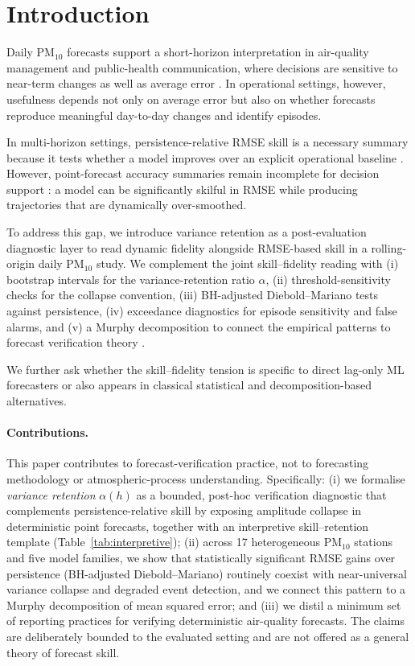 \documentclass[3p,times,single-column]{elsarticle}
\begin{document}
\section{Introduction}

Daily PM$_{10}$ forecasts support a short-horizon interpretation in air-quality management and public-health communication, where decisions are sensitive to near-term changes as well as average error \cite{who2021,wilks2011}. In operational settings, however, usefulness depends not only on average error but also on whether forecasts reproduce meaningful day-to-day changes and identify episodes.

In multi-horizon settings, persistence-relative RMSE skill is a necessary summary because it tests whether a model improves over an explicit operational baseline \cite{hyndman2006}. However, point-forecast accuracy summaries remain incomplete for decision support \cite{gneiting2011}: a model can be significantly skilful in RMSE while producing trajectories that are dynamically over-smoothed.

To address this gap, we introduce variance retention as a post-evaluation diagnostic layer to read dynamic fidelity alongside RMSE-based skill in a rolling-origin daily PM$_{10}$ study. We complement the joint skill–fidelity reading with (i) bootstrap intervals for the variance-retention ratio $\alpha$, (ii) threshold-sensitivity checks for the collapse convention, (iii) BH-adjusted Diebold–Mariano tests against persistence, (iv) exceedance diagnostics for episode sensitivity and false alarms, and (v) a Murphy decomposition to connect the empirical patterns to forecast verification theory \cite{murphy1988}.

We further ask whether the skill–fidelity tension is specific to direct lag-only ML forecasters or also appears in classical statistical and decomposition-based alternatives.

\paragraph{Contributions.} This paper contributes to forecast-verification
practice, not to forecasting methodology or atmospheric-process understanding.
Specifically: (i) we formalise \emph{variance retention} $\alpha(h)$ as a
bounded, post-hoc verification diagnostic that complements persistence-relative
skill by exposing amplitude collapse in deterministic point forecasts, together
with an interpretive skill--retention template (Table~\ref{tab:interpretive});
(ii) across 17 heterogeneous PM$_{10}$ stations and five model families, we show
that statistically significant RMSE gains over persistence (BH-adjusted
Diebold--Mariano) routinely coexist with near-universal variance collapse and
degraded event detection, and we connect this pattern to a Murphy decomposition
of mean squared error; and (iii) we distil a minimum set of reporting practices
for verifying deterministic air-quality forecasts. The claims are deliberately
bounded to the evaluated setting and are not offered as a general theory of
forecast skill.
\end{document}
